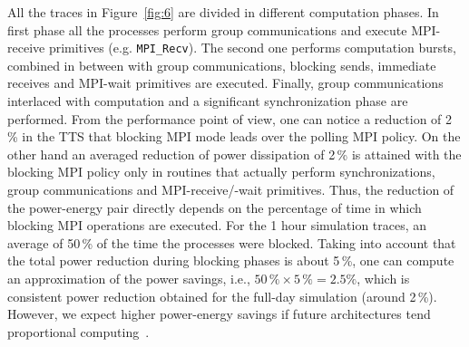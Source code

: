 All  the  traces  in   Figure~\ref{fig:6}  are  divided  in  different
computation  phases. In first  phase all  the processes  perform group
communications      and       execute      MPI-receive      primitives
(e.g. \texttt{MPI\_Recv}). The second one performs computation bursts,
combined  in  between   with  group  communications,  blocking  sends,
immediate  receives and  MPI-wait primitives  are  executed.  Finally,
group  communications interlaced  with computation  and  a significant
synchronization  phase are  performed. From  the performance  point of
view, one can notice a reduction of 2\,\% in the TTS that blocking MPI
mode leads over the polling MPI  policy. On the other hand an averaged
reduction of power dissipation of  2\,\% is attained with the blocking
MPI policy  only in  routines that actually  perform synchronizations,
group  communications  and  MPI-receive/-wait primitives.   Thus,  the
reduction of the power-energy  pair directly depends on the percentage
of time in which blocking MPI  operations are executed. For the 1 hour
simulation traces, an average of 50\,\% of the time the processes were
blocked.  Taking  into account that  the total power  reduction during
blocking phases  is about 5\,\%,  one can compute an  approximation of
the  power savings,  i.e., $50\,\%  \times  5\,\% =  2.5\%$, which  is
consistent  power  reduction  obtained  for  the  full-day  simulation
(around  2\,\%). However,  we  expect higher  power-energy savings  if
future architectures tend proportional computing~\citep{Barroso-2007}.



